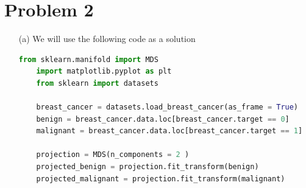 \documentclass[12pt, letterpaper]{article}
\begin{document}
\newpage
\noindent\makebox[\linewidth]{\rule{18cm}{0.4pt}}
\section*{Problem 2}
\begin{enumerate}
    \item [(a)] We will use the following code as a solution 
\begin{lstlisting}[language = python]
    from sklearn.manifold import MDS
    import matplotlib.pyplot as plt
    from sklearn import datasets
    
    breast_cancer = datasets.load_breast_cancer(as_frame = True)
    benign = breast_cancer.data.loc[breast_cancer.target == 0]
    malignant = breast_cancer.data.loc[breast_cancer.target == 1]
    
    projection = MDS(n_components = 2 )
    projected_benign = projection.fit_transform(benign)
    projected_malignant = projection.fit_transform(malignant)
    

\end{lstlisting}
\end{enumerate}
\end{document}
